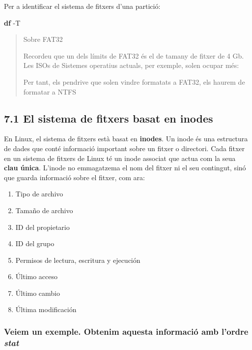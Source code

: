 \documentclass[
  12 pt,
  a4paper,
]{article}
\newenvironment{Shaded}{\begin{snugshade}}{\end{snugshade}}
\newcommand{\AttributeTok}[1]{\textcolor[rgb]{0.13,0.29,0.53}{#1}}
\newcommand{\FunctionTok}[1]{\textcolor[rgb]{0.13,0.29,0.53}{\textbf{#1}}}
\providecommand{\tightlist}{%
  \setlength{\itemsep}{0pt}\setlength{\parskip}{0pt}}
\begin{document}
Per a identificar el sistema de fitxers d'una partició:

\begin{Shaded}
\begin{Highlighting}[]
\FunctionTok{df} \AttributeTok{{-}T}
\end{Highlighting}
\end{Shaded}

\begin{quote}
Sobre FAT32

Recordeu que un dels límits de FAT32 és el de tamany de fitxer de 4 Gb.
Les ISOs de Sistemes operatius actuals, per exemple, solen ocupar més:

Per tant, els pendrive que solen vindre formatats a FAT32, els haurem de
formatar a NTFS
\end{quote}

\subsection{7.1 El sistema de fitxers basat en
inodes}\label{el-sistema-de-fitxers-basat-en-inodes}

En Linux, el sistema de fitxers està basat en \textbf{inodes}. Un inode
és una estructura de dades que conté informació important sobre un
fitxer o directori. Cada fitxer en un sistema de fitxers de Linux té un
inode associat que actua com la seua \textbf{clau única}. L'inode no
emmagatzema el nom del fitxer ni el seu contingut, sinó que guarda
informació sobre el fitxer, com ara:

\begin{enumerate}
\def\labelenumi{\arabic{enumi}.}
\tightlist
\item
  Tipo de archivo
\item
  Tamaño de archivo
\item
  ID del propietario
\item
  ID del grupo
\item
  Permisos de lectura, escritura y ejecución
\item
  Último acceso
\item
  Último cambio
\item
  Última modificación
\end{enumerate}

\subsubsection{\texorpdfstring{Veiem un exemple. Obtenim aquesta
informació amb l'ordre
\emph{stat}}{Veiem un exemple. Obtenim aquesta informació amb l'ordre stat}}\label{veiem-un-exemple.-obtenim-aquesta-informaciuxf3-amb-lordre-stat}
\end{document}

